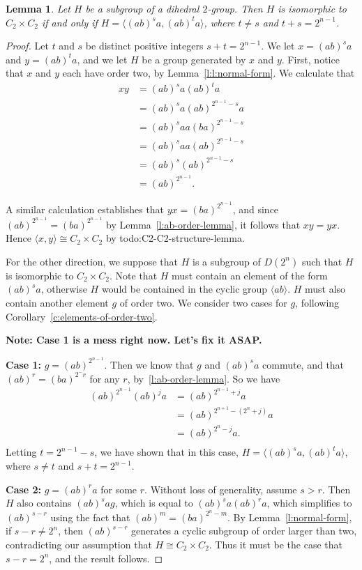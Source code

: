 \documentclass{amsart}
\numberwithin{equation} {section}
\newtheorem{lemma}[equation]{Lemma}
\theoremstyle{definition}
\begin{document}
\begin{lemma}\label{l:copies-of-C2-times-C2}
Let $H$ be a subgroup of a dihedral $2$-group. Then $H$ is isomorphic to $C_2 \times C_2$ if and only if $H = \langle (ab)^sa, (ab)^ta \rangle$, where $t \neq s$ and $t + s = 2^{n-1}$.
\end{lemma}

\begin{proof}
Let $t$ and $s$ be distinct positive integers $s + t = 2^{n-1}$. We let $x = (ab)^sa$ and $y = (ab)^ta$, and we let $H$ be a group generated by $x$ and $y$. First, notice that $x$ and $y$ each have order two, by Lemma~\ref{l:l:normal-form}. We calculate that
\begin{align*}
xy &= (ab)^sa(ab)^ta \\
&= (ab)^s a (ab)^{2^{n-1} - s} a \\
&= (ab)^s a a (ba)^{2^{n-1} - s} \\
&= (ab)^s a a (ab)^{2^{n-1} - s} \\
&= (ab)^s (ab)^{2^{n-1} - s} \\
&= (ab)^{2^{n-1}}.
\end{align*}

A similar calculation establishes that $yx = (ba)^{2^{n-1}}$, and since $(ab)^{2^{n-1}} = (ba)^{2^{n-1}}$ by Lemma~\ref{l:ab-order-lemma}, it follows that $xy = yx$. Hence $\langle x, y \rangle \cong C_2 \times C_2$ by todo:C2-C2-structure-lemma. 

For the other direction, we suppose that $H$ is a subgroup of $D(2^n)$ such that $H$ is isomorphic to $C_2 \times C_2$. Note that $H$ must contain an element of the form $(ab)^sa$, otherwise $H$ would be contained in the cyclic group $\langle ab \rangle$. $H$ must also contain another element $g$ of order two. We consider two cases for $g$, following Corollary~\ref{c:elements-of-order-two}. 

\textbf{Note: Case 1 is a mess right now. Let's fix it ASAP.} 

\textbf{Case 1:} $g = (ab)^{2^{n-1}}$. Then we know that $g$ and $(ab)^sa$ commute, and that  $(ab)^r = (ba)^{2^ - r}$ for any $r$, by~\ref{l:ab-order-lemma}. So we have
\begin{align*}
(ab)^{2^{n-1}}(ab)^j a &= (ab)^{2^{n-1} +j} a \\
&= (ab)^{2^{n+1} - (2^n + j)} a\\
&= (ab)^{2^n - j} a. \\
\end{align*}
Letting $t = 2^{n-1} - s$, we have shown that in this case, $H = \langle (ab)^s a, (ab)^t a \rangle$, where $s \neq t$ and $s + t = 2^{n-1}$.

\textbf{Case 2:} $g = (ab)^r a $ for some $r$. Without loss of generality, assume $s > r$. Then $H$ also contains $(ab)^s a g$, which is equal to $(ab)^s a (ab)^r a$, which simplifies to $(ab)^{s-r}$ using the fact that $(ab)^m = (ba)^{2^n - m}$. By Lemma~\ref{l:normal-form}, if $s-r \neq 2^n$, then $(ab)^{s-r}$ generates a cyclic subgroup of order larger than two, contradicting our assumption that $H \cong C_2 \times C_2$. Thus it must be the case that $s-r = 2^n$, and the result follows. 
\end{proof}
\end{document}
